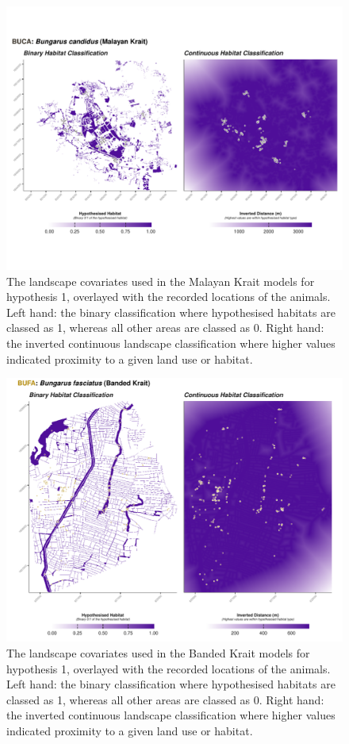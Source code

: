 \documentclass[10pt,a4paper]{article}
\begin{document}
\begin{figure}
\includegraphics[width=1\linewidth]{../../figures/landscape_plot_BUCA_H1} \caption{The landscape covariates used in the Malayan Krait models for hypothesis 1, overlayed with the recorded locations of the animals. Left hand: the binary classification where hypothesised habitats are classed as 1, whereas all other areas are classed as 0. Right hand: the inverted continuous landscape classification where higher values indicated proximity to a given land use or habitat.}\label{fig:landscapePlotBUCA1}
\end{figure}

\begin{figure}
\includegraphics[width=1\linewidth]{../../figures/landscape_plot_BUFA_H1} \caption{The landscape covariates used in the Banded Krait models for hypothesis 1, overlayed with the recorded locations of the animals. Left hand: the binary classification where hypothesised habitats are classed as 1, whereas all other areas are classed as 0. Right hand: the inverted continuous landscape classification where higher values indicated proximity to a given land use or habitat.}\label{fig:landscapePlotBUFA1}
\end{figure}
\end{document}
